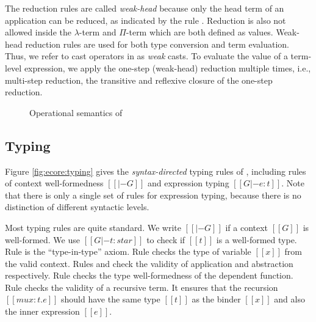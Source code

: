 The reduction rules are called \emph{weak-head} because only the
head term of an application can be reduced, as indicated by the rule
. Reduction is also not
allowed inside the $\lambda$-term and $\Pi$-term which are both defined as values.
Weak-head reduction rules are used for both type conversion and term
evaluation. Thus, we refer to cast operators in \ecore as \emph{weak}
casts. To evaluate the value of a term-level expression, we apply the
one-step (weak-head) reduction multiple times, i.e., multi-step reduction, the
transitive and reflexive closure of the one-step reduction.



\begin{figure}[t]
\begin{small}
\centering
\renewcommand{\ottdrule}[4][]{{\inferrule{#2 }{#3}\,{\scriptsize\ottdrulename{#4}}}}
\renewenvironment{ottdefnblock}[3][]{\raggedright \framebox{\mbox{#2}} \quad #3 \\[0pt]}{}
\renewcommand{\ottusedrule}[1]{$#1\quad$}
\begin{spacing}{0.8}
\ottdefnstep{}
\end{spacing}
\end{small}
\caption{Operational semantics of \ecore}
    \label{fig:ecore:opsem}
\end{figure}

\subsection{Typing}\label{sec:ecore:type}

Figure \ref{fig:ecore:typing} gives the \emph{syntax-directed} typing
rules of \ecore, including rules of context well-formedness $[[|- G]]$
and expression typing $[[G |- e : t]]$. Note that there is only a
single set of rules for expression typing, because there is no
distinction of different syntactic levels.

Most typing rules are quite standard. We write $[[|- G]]$ if a context
$[[G]]$ is well-formed. We use $[[G |- t : star]]$ to check if $[[t]]$ is a
well-formed type. Rule  is the ``type-in-type''
axiom. Rule  checks the type of variable $[[x]]$ from
the valid context. Rules  and  check
the validity of application and abstraction respectively. Rule 
checks the type well-formedness of the dependent function. Rule
 checks the validity of a
recursive term. It ensures that the 
recursion $[[mu x:t.e]]$ should have the same type $[[t]]$ as the
binder $[[x]]$ and also the inner expression $[[e]]$.

